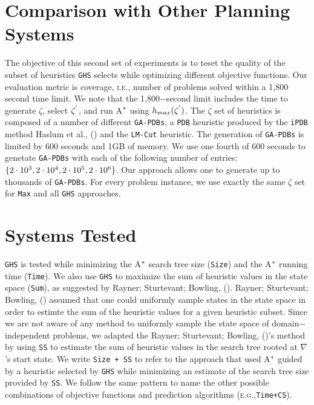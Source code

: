 \section{Comparison with Other Planning Systems}
\noindent
The objective of this second set of experiments is to teset the quality of the subset of heuristics \texttt{GHS} selects while optimizing different objective functions. Our evaluation metric is coverage, \textsc{i.e.,} number of problems solved within a 1,800 second time limit. We note that the 1,800$-$second limit includes the time to generate $\zeta$, select $\zeta\sp{'}$, and run A$\sp{*}$ using $h_{max}(\zeta\sp{'})$. The $\zeta$ set of heuristics is composed of a number of different \texttt{GA-PDBs}, a \texttt{PDB} heuristic produced by the \texttt{iPDB} method Haslum et al., (\citeyear{haslum2007domain}) and the \texttt{LM-Cut} heuristic. The generation of \texttt{GA-PDBs} is limited by 600 seconds and 1GB of memory. We use one fourth of 600 seconds to genetate \texttt{GA-PDBs} with each of the following number of entries: $\{2 \cdot 10\sp{3}, 2 \cdot 10\sp{4}, 2 \cdot 10\sp{5}, 2 \cdot 10\sp{6}\}$. Our approach allows one to generate up to thousands of \texttt{GA-PDBs}. For every problem instance, we use exactly the same $\zeta$ set for \texttt{Max} and all \texttt{GHS} approaches.\\

\section{Systems Tested}
\noindent
\texttt{GHS} is tested while minimizing the A$\sp{*}$ search tree size (\texttt{Size}) and the A$\sp{*}$ running time (\texttt{Time}). We also use \texttt{GHS} to maximize the sum of heuristic values in the state space (\texttt{Sum}), as suggested by Rayner; Sturtevant; Bowling, (\citeyear{raynersss13}). Rayner; Sturtevant; Bowling, (\citeyear{raynersss13}) assumed that one could uniformly sample states in the state space in order to estimte the sum of the heuristic values for a given heuristic subset. Since we are not aware of any method to uniformly sample the state space of domain$-$independent problems, we adapted the Rayner; Sturtevant; Bowling, (\citeyear{raynersss13})'s method by using \texttt{SS} to estimate the sum of heuristic values in the search tree rooted at $\nabla$'s start state. We write \texttt{Size + SS} to refer to the approach that used A$\sp{*}$ guided by a heuristic selected by \texttt{GHS} while minimizing an estimate of the search tree size provided by \texttt{SS}. We follow the same pattern to name the other possible combinations of objective functions and prediction algorithms (\textsc{e.g.,}\texttt{Time+CS}).

